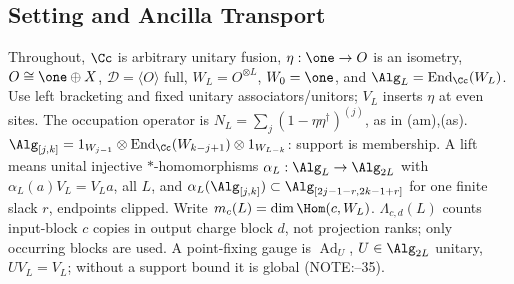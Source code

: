 \subsection{Setting and Ancilla Transport}

Throughout, \(\Cc\) is arbitrary unitary fusion, \(\eta:\one\to O\) is an isometry, \(O\cong\one\oplus X\),
\(\mathcal D=\langle O\rangle\) full, \(W_L=O^{\otimes L}\), \(W_0=\one\), and \(\Alg_L=\operatorname{End}_\Cc(W_L)\).
Use left bracketing and fixed unitary associators/unitors; \(V_L\) inserts \(\eta\) at even sites.
The occupation operator is \(N_L=\sum_j(1-\eta\eta^\dagger)^{(j)}\), as in (am),(as).
\(\Alg_{[j,k]}=1_{W_{j-1}}\otimes\operatorname{End}_\Cc(W_{k-j+1})\otimes1_{W_{L-k}}\): support is membership.
A lift means unital injective \(*\)-homomorphisms \(\alpha_L:\Alg_L\to\Alg_{2L}\) with \(\alpha_L(a)V_L=V_La\), all \(L\), and
\(\alpha_L(\Alg_{[j,k]})\subset\Alg_{[2j-1-r,2k-1+r]}\) for one finite slack \(r\), endpoints clipped.
Write \(m_c(L)=\dim\Hom(c,W_L)\). \(\Lambda_{c,d}(L)\) counts input-block \(c\) copies in output charge block \(d\),
not projection ranks; only occurring blocks are used. A point-fixing gauge is \(\operatorname{Ad}_U\),
\(U\in\Alg_{2L}\) unitary, \(UV_L=V_L\); without a support bound it is global (NOTE:--35).


